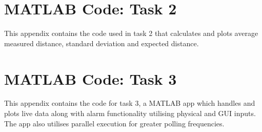 \documentclass[a4paper,12pt]{article}
\begin{document}
\section{MATLAB Code: Task 2}
This appendix contains the code used in task 2 that calculates and plots average measured distance, standard deviation and expected distance.

\section{MATLAB Code: Task 3}
This appendix contains the code for task 3, a MATLAB app which handles and plots live data along with alarm functionality utilising physical and GUI inputs. The app also utilises parallel execution for greater polling frequencies.

\label{Appendix:C}

\end{document}
